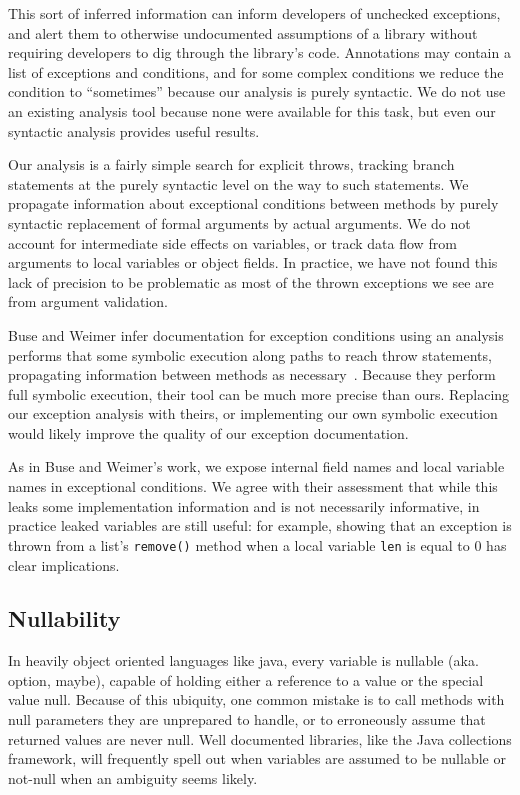This sort of inferred information can inform developers of unchecked exceptions,
and alert them to otherwise undocumented assumptions of a library without
requiring developers to dig through the library's code.
Annotations may contain a list of exceptions and conditions, and for some
complex conditions we reduce the condition to ``sometimes'' because our analysis
is purely syntactic.  We do not use an
existing analysis tool because none were available for this task, but even our
syntactic analysis provides useful results.

Our analysis is a fairly simple search for explicit throws, tracking branch
statements at the purely syntactic level on the
way to such statements.  We propagate information about exceptional conditions
between methods by purely syntactic replacement of formal arguments by actual
arguments.  We do not account for intermediate side effects on variables, or
track data flow from arguments to local variables or object fields.  In
practice, we have not found this lack of precision to be problematic as most of
the thrown exceptions we see are from argument validation.

Buse and Weimer infer documentation for exception conditions
using an analysis performs that some symbolic execution along paths to reach throw
statements, propagating information between methods as necessary~\cite{autodoc}.
Because they
perform full symbolic execution, their tool can be much more precise than ours.
Replacing our exception analysis with theirs, or implementing our own symbolic
execution would likely improve the quality of our exception documentation.  

As in Buse and Weimer's work, we expose internal field names and
local variable names in exceptional conditions.  We agree with their assessment
that while this leaks some
implementation information and is not necessarily informative, in practice
leaked variables are still useful: for example, showing that an exception is
thrown from a list's \texttt{remove()} method when a local variable \texttt{len}
is equal to 0 has clear implications.

\subsection{Nullability}
\label{sec:Nullability}

In heavily object oriented languages like java, every variable is nullable
(aka. option, maybe), capable of holding either a reference to a value or the
special value null.  Because of this ubiquity, one common mistake is to call
methods with null parameters they are unprepared to handle, or to erroneously
assume that returned values are never null.  Well documented libraries, like
the Java collections framework, will frequently spell out when variables are
assumed to be nullable or not-null when an ambiguity seems likely.

